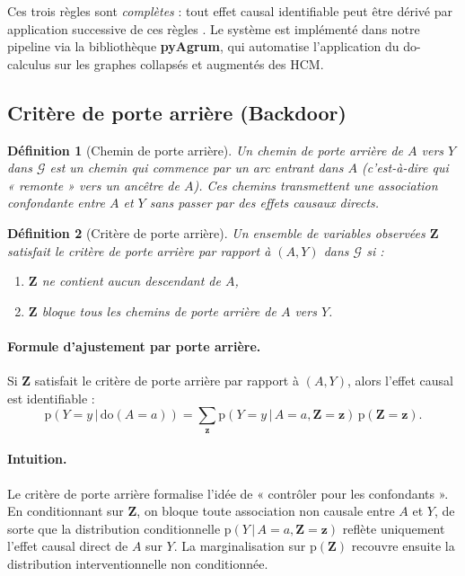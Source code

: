 \documentclass[11pt,a4paper]{article}
\newcommand{\rmdo}{\mathrm{do}}
\newcommand{\g}{\,\vert\,}
\newcommand{\pr}{\mathrm{p}}
\newtheorem{definition}{Définition}
\begin{document}
Ces trois règles sont \emph{complètes} : tout effet causal identifiable peut être dérivé par application successive de ces règles \citep{Pearl2009}.
Le système est implémenté dans notre pipeline via la bibliothèque \textbf{pyAgrum}, qui automatise l'application du do-calculus sur les graphes collapsés et augmentés des HCM.

\subsection{Critère de porte arrière (Backdoor)}

\begin{definition}[Chemin de porte arrière]
Un \emph{chemin de porte arrière} de $A$ vers $Y$ dans $\mathcal{G}$ est un chemin qui commence par un arc entrant dans $A$ (c'est-à-dire qui « remonte » vers un ancêtre de $A$).
Ces chemins transmettent une association confondante entre $A$ et $Y$ sans passer par des effets causaux directs.
\end{definition}

\begin{definition}[Critère de porte arrière]
Un ensemble de variables observées $\mathbf{Z}$ satisfait le \emph{critère de porte arrière} par rapport à $(A, Y)$ dans $\mathcal{G}$ si :
\begin{enumerate}[label=(\roman*)]
  \item $\mathbf{Z}$ ne contient aucun descendant de $A$,
  \item $\mathbf{Z}$ bloque tous les chemins de porte arrière de $A$ vers $Y$.
\end{enumerate}
\end{definition}

\paragraph{Formule d'ajustement par porte arrière.}
Si $\mathbf{Z}$ satisfait le critère de porte arrière par rapport à $(A, Y)$, alors l'effet causal est identifiable :
\begin{equation}
  \pr(Y = y \g \rmdo(A=a)) = \sum_{\mathbf{z}} \pr(Y=y \g A=a, \mathbf{Z}=\mathbf{z})\, \pr(\mathbf{Z}=\mathbf{z}).
  \label{eq:backdoor}
\end{equation}

\paragraph{Intuition.}
Le critère de porte arrière formalise l'idée de « contrôler pour les confondants ».
En conditionnant sur $\mathbf{Z}$, on bloque toute association non causale entre $A$ et $Y$, de sorte que la distribution conditionnelle $\pr(Y \g A=a, \mathbf{Z}=\mathbf{z})$ reflète uniquement l'effet causal direct de $A$ sur $Y$.
La marginalisation sur $\pr(\mathbf{Z})$ recouvre ensuite la distribution interventionnelle non conditionnée.
\end{document}
